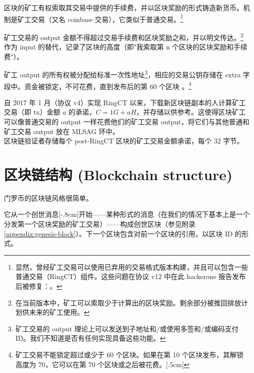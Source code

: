 {区块的矿工有权索取其交易中提供的手续费，并以区块奖励的形式铸造新货币。机制是矿工交易（又名 coinbase 交易），它类似于普通交易。\footnote{显然，曾经矿工交易可以使用已弃用的交易格式版本构建，并且可以包含一些普通交易（RingCT）组件。这些问题在协议 v12 中在此 hackerone 报告发布后被修复：\cite{miner-tx-checks}。}

矿工交易的 output 金额不得超过交易手续费和区块奖励之和，并以明文传达。\footnote{在当前版本中，矿工可以索取少于计算出的区块奖励。剩余部分被推回排放计划供未来的矿工使用。}作为 input 的替代，记录了区块的高度（即"我索取第 n 个区块的区块奖励和手续费"）。

矿工 output 的所有权被分配给标准一次性地址\footnote{矿工交易的 output 理论上可以发送到子地址和/或使用多签和/或编码支付 ID。我们不知道是否有任何实现具备这些功能。}，相应的交易公钥存储在 extra 字段中。资金被锁定，不可花费，直到发布后的第 60 个区块 \cite{transaction-lock}。\footnote{矿工交易不能锁定超过或少于 60 个区块。如果在第 10 个区块发布，其解锁高度为 70，它可以在第 70 个区块或之后被花费。[.5cm]}%

自 2017 年 1 月（协议 v4）\cite{ringct-dates}实现 RingCT 以来，下载新区块链副本的人计算矿工交易（即 tx）金额 $a$ 的承诺，$C = 1G + aH$，并存储以供参考。这使得区块矿工可以像普通交易的 output 一样花费他们的矿工交易 output，将它们与其他普通和矿工交易 output 放在 MLSAG 环中。\\

区块链验证者存储每个 post-RingCT 区块的矿工交易金额承诺，每个 32 字节。



\section{区块链结构 (Blockchain structure)}
\label{sec:blockchain-structure}

门罗币的区块链风格很简单。

它从一个创世消息[-.8cm]开始——某种形式的消息（在我们的情况下基本上是一个分发第一个区块奖励的矿工交易）——构成创世区块（参见附录 \ref{appendix:genesis-block}）。下一个区块包含对前一个区块的引用，以区块 ID 的形式。

}
